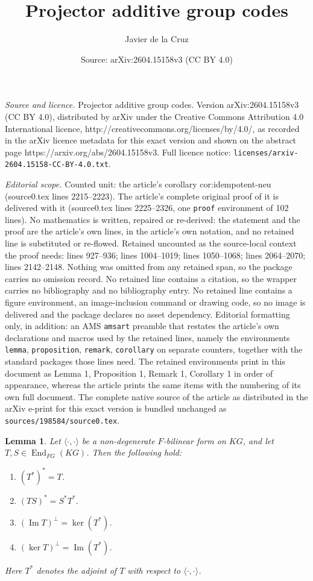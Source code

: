 \documentclass[10pt,a4paper]{amsart}
\title{Projector additive group codes}
\author{Javier de la Cruz}
\date{Source: arXiv:2604.15158v3 (CC BY 4.0)}
\newtheorem{lemma}{Lemma}
\begin{document}
\maketitle

\noindent\emph{Source and licence.} Projector additive group codes. Version arXiv:2604.15158v3 (CC BY 4.0), distributed by arXiv under the Creative Commons Attribution 4.0 International licence, http://creativecommons.org/licenses/by/4.0/, as recorded in the arXiv licence metadata for this exact version and shown on the abstract page https://arxiv.org/abs/2604.15158v3. Full licence notice: \texttt{licenses/arxiv-2604.15158-CC-BY-4.0.txt}.\par\smallskip

\noindent\textit{Editorial scope.} Counted unit: the article's corollary cor:idempotent-neu (source0.tex lines 2215--2223). The article's complete original proof of it is delivered with it (source0.tex lines 2225--2326, one \texttt{proof} environment of 102 lines). No mathematics is written, repaired or re-derived: the statement and the proof are the article's own lines, in the article's own notation, and no retained line is substituted or re-flowed.  Retained uncounted as the source-local context the proof needs: lines 927--936; lines 1004--1019; lines 1050--1068; lines 2064--2070; lines 2142--2148.  Nothing was omitted from any retained span, so the package carries no omission record.  No retained line contains a citation, so the wrapper carries no bibliography and no bibliography entry.  No retained line contains a figure environment, an image-inclusion command or drawing code, so no image is delivered and the package declares no asset dependency.  Editorial formatting only, in addition: an AMS \texttt{amsart} preamble that restates the article's own declarations and macros used by the retained lines, namely the environments \texttt{lemma}, \texttt{proposition}, \texttt{remark}, \texttt{corollary} on separate counters, together with the standard packages those lines need.  The retained environments print in this document as Lemma 1, Proposition 1, Remark 1, Corollary 1 in order of appearance, whereas the article prints the same items with the numbering of its own full document.  The complete native source of the article as distributed in the arXiv e-print for this exact version is bundled unchanged as \texttt{sources/198584/source0.tex}.
\begin{lemma}\label{lem:adjoint-basic}
Let $\langle\cdot,\cdot\rangle$ be a non-degenerate $F$-bilinear form on $KG$, and let $T,S\in \operatorname{End}_{FG}(KG)$. Then the following hold:
\begin{enumerate}
    \item $(T^\ast)^\ast=T$.
    \item $(TS)^\ast=S^\ast T^\ast$.
    \item $(\operatorname{Im}T)^\perp=\ker(T^\ast)$.
    \item $(\ker T)^\perp=\operatorname{Im}(T^\ast)$.
\end{enumerate}
Here $T^\ast$ denotes the adjoint of $T$ with respect to $\langle\cdot,\cdot\rangle$.
\end{lemma}
\end{document}
